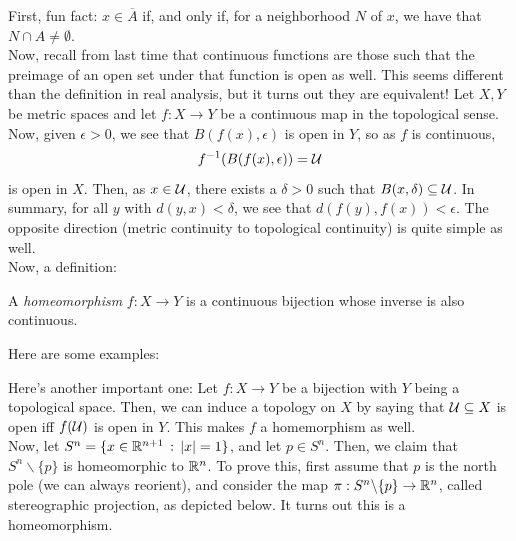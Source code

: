 
First, fun fact: $x \in \overline{A}$ if, and only if, for a neighborhood $N$ of $x$, we have that $N \cap A \ne \emptyset$.\\

Now, recall from last time that continuous functions are those such that the preimage of an open set under that function is open as well. This seems different than the definition in real analysis, but it turns out they are equivalent! Let $X, Y$ be metric spaces and let $f : X \to Y$ be a continuous map in the topological sense. Now, given $\epsilon > 0$, we see that $B(f(x), \epsilon)$ is open in $Y$, so as $f$ is continuous, 
\[ f^{-1}(B(f(x), \epsilon)) = \cal{U} \]
is open in $X$. Then, as $x \in \cal{U}$, there exists a $\delta > 0$ such that $B(x, \delta) \subseteq \cal{U}$. In summary, for all $y$ with $d(y, x) < \delta$, we see that $d(f(y), f(x)) < \epsilon$. The opposite direction (metric continuity to topological continuity) is quite simple as well.\\

Now, a definition:

\begin{definition}
    A \emph{homeomorphism} $f : X \to Y$ is a continuous bijection whose inverse is also continuous. 
\end{definition}
Here are some examples:



Here's another important one: Let $f : X \to Y$ be a bijection with $Y$ being a topological space. Then, we can induce a topology on $X$ by saying that $\cal{U} \subseteq X$ is open iff $f(\cal{U})$ is open in $Y$. This makes $f$ a homemorphism as well.\\

Now, let $S^n = \{x \in \R^{n + 1} \col \abs{x} = 1\}$, and let $p \in S^n$. Then, we claim that $S^n \backslash \{p\}$ is homeomorphic to $\R^n$. To prove this, first assume that $p$ is the north pole (we can always reorient), and consider the map $\pi : S^n \backslash \{p\} \to \R^n$, called stereographic projection, as depicted below. It turns out this is a homeomorphism.


